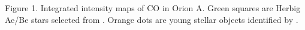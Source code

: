Figure 1. Integrated intensity maps of CO in Orion A. Green squares are Herbig Ae/Be stars selected from \citet{2014yCat....1.2023S}. Orange dots are young stellar objects identified by \citet{Megeath12}.